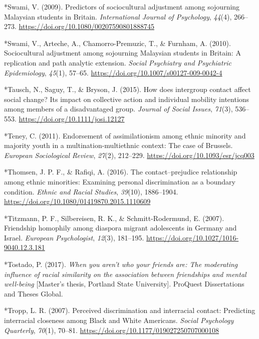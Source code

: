 \documentclass[12pt, letterpaper]{article}
\begin{document}
\leavevmode\hypertarget{ref-1020}{}%
*Swami, V. (2009). Predictors of sociocultural adjustment among
sojourning Malaysian students in Britain. \emph{International Journal of
Psychology}, \emph{44}(4), 266--273.
\url{https://doi.org/10.1080/00207590801888745}

\leavevmode\hypertarget{ref-733}{}%
*Swami, V., Arteche, A., Chamorro-Premuzic, T., \& Furnham, A. (2010).
Sociocultural adjustment among sojourning Malaysian students in Britain:
A replication and path analytic extension. \emph{Social Psychiatry and
Psychiatric Epidemiology}, \emph{45}(1), 57--65.
\url{https://doi.org/10.1007/s00127-009-0042-4}

\leavevmode\hypertarget{ref-2375}{}%
*Tausch, N., Saguy, T., \& Bryson, J. (2015). How does intergroup
contact affect social change? Its impact on collective action and
individual mobility intentions among members of a disadvantaged group.
\emph{Journal of Social Issues}, \emph{71}(3), 536--553.
\url{https://doi.org/10.1111/josi.12127}

\leavevmode\hypertarget{ref-46}{}%
*Teney, C. (2011). Endorsement of assimilationism among ethnic minority
and majority youth in a multination-multiethnic context: The case of
Brussels. \emph{European Sociological Review}, \emph{27}(2), 212--229.
\url{https://doi.org/10.1093/esr/jcq003}

\leavevmode\hypertarget{ref-1412}{}%
*Thomsen, J. P. F., \& Rafiqi, A. (2016). The contact--prejudice
relationship among ethnic minorities: Examining personal discrimination
as a boundary condition. \emph{Ethnic and Racial Studies},
\emph{39}(10), 1886--1904.
\url{https://doi.org/10.1080/01419870.2015.1110609}

\leavevmode\hypertarget{ref-1966}{}%
*Titzmann, P. F., Silbereisen, R. K., \& Schmitt-Rodermund, E. (2007).
Friendship homophily among diaspora migrant adolescents in Germany and
Israel. \emph{European Psychologist}, \emph{12}(3), 181--195.
\url{https://doi.org/10.1027/1016-9040.12.3.181}

\leavevmode\hypertarget{ref-1221}{}%
*Tostado, P. (2017). \emph{When you aren't who your friends are: The
moderating influence of racial similarity on the association between
friendships and mental well-being} {[}Master's thesis, Portland State
University{]}. ProQuest Dissertations and Theses Global.

\leavevmode\hypertarget{ref-933}{}%
*Tropp, L. R. (2007). Perceived discrimination and interracial contact:
Predicting interracial closeness among Black and White Americans.
\emph{Social Psychology Quarterly}, \emph{70}(1), 70--81.
\url{https://doi.org/10.1177/019027250707000108}
\end{document}
